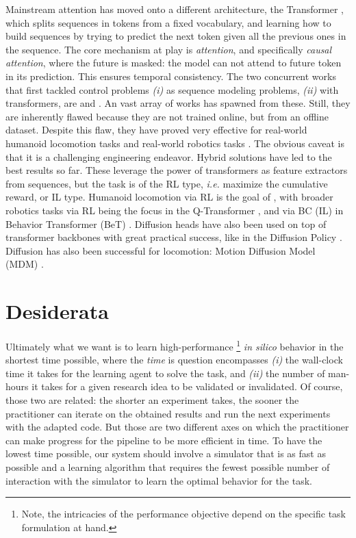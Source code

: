 \documentclass[12pt,a4paper]{article}
\begin{document}
Mainstream attention has moved onto a different architecture,
the Transformer \cite{Vaswani2017-lk},
which splits sequences in tokens from a fixed vocabulary,
and learning how to build sequences by trying to predict the next token given all the previous
ones in the sequence.
The core mechanism at play is \emph{attention}, and specifically \emph{causal attention}, where
the future is masked: the model can not attend to future token in its prediction.
This ensures temporal consistency.
The two concurrent works that first tackled control problems
\textit{(i)} as sequence modeling problems,
\textit{(ii)} with transformers, are
\cite{Chen2021-qq} and \cite{Janner2021-wn}.
An vast array of works has spawned from these.
Still, they are inherently flawed because they are not trained online, but from an offline dataset.
Despite this flaw, they have proved very effective for real-world humanoid locomotion tasks
\cite{Radosavovic2024-xl}
and real-world robotics tasks \cite{Brohan2022-vs, Brohan2023-rm}.
The obvious caveat is that it is a challenging engineering endeavor.
Hybrid solutions have led to the best results so far.
These leverage the power of transformers as feature extractors from sequences, but the task is of
the RL type, \textit{i.e.} maximize the cumulative reward, or IL type.
Humanoid locomotion via RL is the goal of \cite{Radosavovic2024-dm},
with broader robotics tasks via RL being the focus in the Q-Transformer \cite{Chebotar2023-hq},
and via BC (IL) in Behavior Transformer (BeT) \cite{Shafiullah2022-ux}.
Diffusion heads have also been used on top of transformer backbones with great practical success,
like in the Diffusion Policy \cite{Chi2023-is}.
Diffusion has also been successful for locomotion:
Motion Diffusion Model (MDM) \cite{Tevet2023-pv}.

\section{Desiderata}
\label{s:desiderata}

Ultimately what we want is to learn high-performance \footnote{Note, the intricacies of the
performance objective depend on the specific task formulation at hand.}
\textit{in silico} behavior in the shortest
time possible, where the \textit{time} is question encompasses
\textit{(i)} the wall-clock time it takes for the learning agent to solve the task, and
\textit{(ii)} the number of man-hours it takes for a given research idea to be validated
or invalidated.
Of course, those two are related: the shorter an experiment takes, the sooner the practitioner can
iterate on the obtained results and run the next experiments with the adapted code.
But those are two different axes on which the practitioner can make progress for the pipeline to
be more efficient in time.
To have the lowest time possible, our system should involve a simulator that is as fast as possible
and a learning algorithm that requires the fewest possible number of interaction with the simulator
to learn the optimal behavior for the task.
\end{document}

